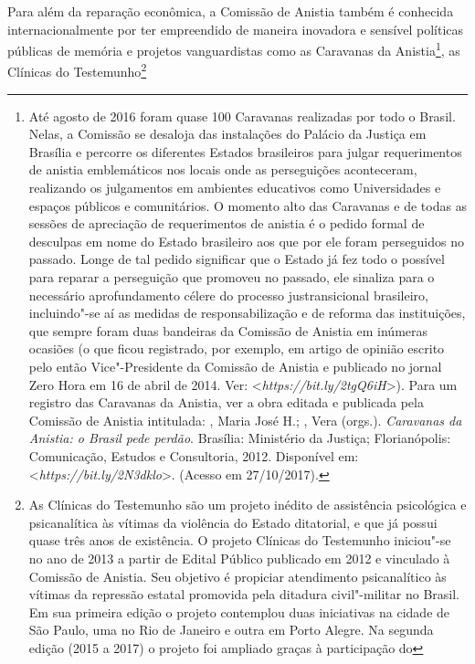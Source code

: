 Para além da reparação econômica, a Comissão de Anistia também é
conhecida internacionalmente por ter empreendido de maneira inovadora e
sensível políticas públicas de memória e projetos vanguardistas como as
Caravanas da Anistia\footnote{Até agosto de 2016 foram quase 100
  Caravanas realizadas por todo o Brasil. Nelas, a Comissão se desaloja
  das instalações do Palácio da Justiça em Brasília e percorre os
  diferentes Estados brasileiros para julgar requerimentos de anistia
  emblemáticos nos locais onde as perseguições aconteceram, realizando
  os julgamentos em ambientes educativos como Universidades e espaços
  públicos e comunitários. O momento alto das Caravanas e de todas as
  sessões de apreciação de requerimentos de anistia é o pedido formal de
  desculpas em nome do Estado brasileiro aos que por ele foram
  perseguidos no passado. Longe de tal pedido significar que o Estado já
  fez todo o possível para reparar a perseguição que promoveu no
  passado, ele sinaliza para o necessário aprofundamento célere do
  processo justransicional brasileiro, incluindo"-se aí as medidas de
  responsabilização e de reforma das instituições, que sempre foram duas
  bandeiras da Comissão de Anistia em inúmeras ocasiões (o que ficou
  registrado, por exemplo, em artigo de opinião escrito pelo então
  Vice"-Presidente da Comissão de Anistia e publicado no jornal Zero Hora
  em 16 de abril de 2014. Ver:
  \textless{}\emph{https://bit.ly/2tgQ6iH}\textgreater{}). Para um registro das
  Caravanas da Anistia, ver a obra editada e publicada pela Comissão de
  Anistia intitulada: , Maria José H.; , Vera (orgs.).
  \emph{Caravanas da Anistia: o Brasil pede perdão}. Brasília:
  Ministério da Justiça; Florianópolis: Comunicação, Estudos e
  Consultoria, 2012. Disponível em:
  \textless{}\emph{https://bit.ly/2N3dklo}\textgreater{}.
  (Acesso em 27/10/2017).}, as Clínicas do Testemunho\footnote{As
  Clínicas do Testemunho são um projeto inédito de assistência
  psicológica e psicanalítica às vítimas da violência do Estado
  ditatorial, e que já possui quase três anos de existência. O projeto
  Clínicas do Testemunho iniciou"-se no ano de 2013 a partir de Edital
  Público publicado em 2012 e vinculado à Comissão de Anistia. Seu
  objetivo é propiciar atendimento psicanalítico às vítimas da repressão
  estatal promovida pela ditadura civil"-militar no Brasil. Em sua
  primeira edição o projeto contemplou duas iniciativas na cidade de São
  Paulo, uma no Rio de Janeiro e outra em Porto Alegre. Na segunda
  edição (2015 a 2017) o projeto foi ampliado graças à participação do
}
